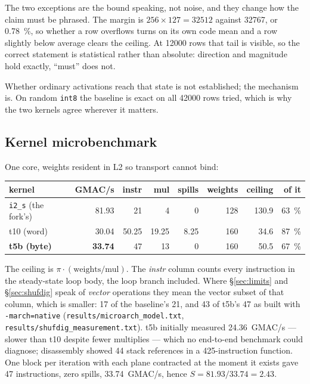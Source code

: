 \documentclass[11pt,a4paper]{article}
\newcommand{\code}[1]{\texttt{#1}}
\begin{document}
The two exceptions are the bound speaking, not noise, and they change how the
claim must be phrased. The margin is $256 \times 127 = \num{32512}$ against
\num{32767}, or \SI{0.78}{\percent}, so whether a row overflows turns on its own
code mean and a row slightly below average clears the ceiling. At \num{12000}
rows that tail is visible, so the correct statement is statistical rather than
absolute: direction and magnitude hold exactly, ``must'' does not.

Whether ordinary activations reach that state is not established; the mechanism
is. On random \code{int8} the baseline is exact on all \num{42000} rows tried,
which is why the two kernels agree wherever it matters.

\subsection{Kernel microbenchmark}\label{sec:microbench}
One core, weights resident in L2 so transport cannot bind:

\begin{center}
\begin{tabular}{lrrrrrrr}
\toprule
kernel & GMAC/s & instr & mul & spills & weights & ceiling & of it \\
\midrule
\code{i2\_s} (the fork's) & 81.93 & 21 & 4 & 0 & 128 & 130.9 & \SI{63}{\percent} \\
t10 (word)              & 30.04 & 50.25 & 19.25 & 8.25 & 160 & 34.6 & \SI{87}{\percent} \\
\textbf{t5b (byte)}     & \textbf{33.74} & 47 & 13 & 0 & 160 & 50.5 & \SI{67}{\percent} \\
\bottomrule
\end{tabular}
\end{center}

The ceiling is $\pi\cdot(\text{weights}/\text{mul})$. The \emph{instr} column
counts every instruction in the steady-state loop body, the loop branch
included. Where \S\ref{sec:limits} and \S\ref{sec:shufdig} speak of \emph{vector}
operations they mean the vector subset of that column, which is smaller: 17 of
the baseline's 21, and 43 of t5b's 47 as built with \code{-march=native}
(\code{results/microarch\_model.txt},
\code{results/shufdig\_measurement.txt}). t5b initially measured
\num{24.36}~GMAC/s --- slower than t10 despite fewer multiplies --- which no
end-to-end benchmark could diagnose; disassembly showed 44 stack references in a
425-instruction function. One block per iteration with each plane contracted at
the moment it exists gave 47 instructions, zero spills, \num{33.74}~GMAC/s,
hence $S=\num{81.93}/\num{33.74}=\num{2.43}$.
\end{document}
